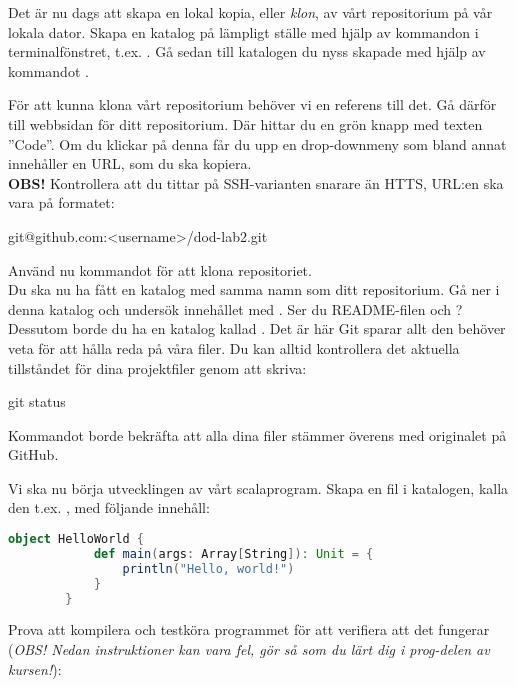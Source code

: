 \begin{Datorarbete}
	\item Det är nu dags att skapa en lokal kopia, eller \emph{klon}, av vårt repositorium på vår lokala dator. Skapa en katalog på lämpligt ställe med hjälp av kommandon i terminalfönstret, t.ex. . Gå sedan till katalogen du nyss skapade med hjälp av kommandot .

	För att kunna klona vårt repositorium behöver vi en referens till det. Gå därför till webbsidan för ditt repositorium. Där hittar du en grön knapp med texten ''Code''. Om du klickar på denna får du upp en drop-downmeny som bland annat innehåller en URL, som du ska kopiera.
	\\


	\textbf{OBS!} Kontrollera att du tittar på SSH-varianten snarare än HTTS, URL:en ska vara på formatet:
	\vspace{-.5em}
	\begin{Code}
		git@github.com:<username>/dod-lab2.git
	\end{Code}
	\vspace{.5em}

	\code{[\ref{git-clone}]} Använd nu kommandot  för att klona repositoriet.
	\\

	Du ska nu ha fått en katalog med samma namn som ditt repositorium. Gå ner i denna katalog och undersök innehållet med . Ser du README-filen och ? Dessutom borde du ha en katalog kallad . Det är här Git sparar allt den behöver veta för att hålla reda på våra filer.
	Du kan alltid kontrollera det aktuella tillståndet för dina projektfiler genom att skriva:

	\begin{Code}
		git status
	\end{Code}

	Kommandot borde bekräfta att alla dina filer stämmer överens med originalet på GitHub.

	\item Vi ska nu börja utvecklingen av vårt scalaprogram. Skapa en fil i katalogen, kalla den t.ex. , med följande innehåll:

	\begin{lstlisting}[language=scala]
		object HelloWorld {
			def main(args: Array[String]): Unit = {
				println("Hello, world!")
			}
		}
	\end{lstlisting}

	Prova att kompilera och testköra programmet för att verifiera att det fungerar (\emph{OBS! Nedan instruktioner kan vara fel, gör så som du lärt dig i prog-delen av kursen!}):


\end{Datorarbete}
